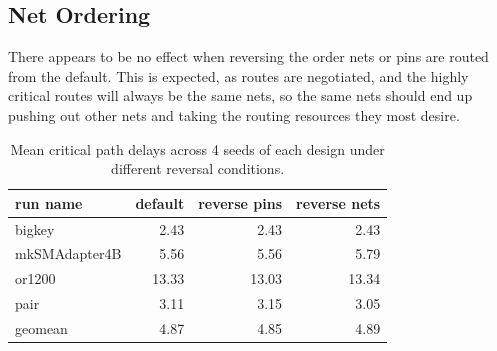 \documentclass[11pt]{article}
\begin{document}
\clearpage

\subsection{Net Ordering}

There appears to be no effect when reversing the order nets or pins are routed from the default. This is expected, as routes are negotiated, and the highly critical routes will always be the same nets, so the same nets should end up pushing out other nets and taking the routing resources they most desire.

\begin{table}[h]\centering
\begin{tabular}{l | *3r}
\hline\hline
run name &  default &  reverse pins &  reverse nets \\
\hline
bigkey & 2.43 & 2.43 & 2.43 \\
mkSMAdapter4B & 5.56 & 5.56 & 5.79 \\
or1200 & 13.33 & 13.03 & 13.34 \\
pair & 3.11 & 3.15 & 3.05 \\
\hline
geomean & 4.87 & 4.85 & 4.89 \\
\hline\hline
\end{tabular}
\caption{Mean critical path delays across 4 seeds of each design under different reversal conditions.}
\label{tab:ordering-effects}
\end{table}
\end{document}
